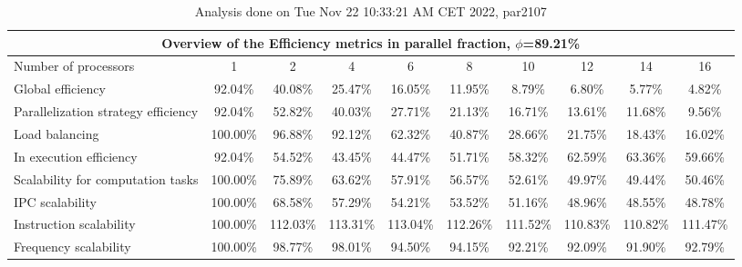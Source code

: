 \begin{table}[h]
\begin{center}
\begin{tabular}{|l|c|c|c|c|c|c|c|c|c|}
\hline
\multicolumn{10}{|c|}{Overview of the Efficiency metrics in parallel fraction, $\phi$=89.21\%} \\
\hline
\hline
Number of processors & 1 & 2 & 4 & 6 & 8 & 10 & 12 & 14 & 16 \\
\hline
\hline
Global efficiency                      &     92.04\% &     40.08\% &     25.47\% &     16.05\% &     11.95\% &      8.79\% &      6.80\% &      5.77\% &      4.82\% \\
\hline
\hline
Parallelization strategy efficiency &     92.04\% &     52.82\% &     40.03\% &     27.71\% &     21.13\% &     16.71\% &     13.61\% &     11.68\% &      9.56\% \\
\hline
Load balancing                   &    100.00\% &     96.88\% &     92.12\% &     62.32\% &     40.87\% &     28.66\% &     21.75\% &     18.43\% &     16.02\% \\
In execution efficiency          &     92.04\% &     54.52\% &     43.45\% &     44.47\% &     51.71\% &     58.32\% &     62.59\% &     63.36\% &     59.66\% \\
\hline
\hline
Scalability for computation tasks   &    100.00\% &     75.89\% &     63.62\% &     57.91\% &     56.57\% &     52.61\% &     49.97\% &     49.44\% &     50.46\% \\
\hline
IPC scalability                  &    100.00\% &     68.58\% &     57.29\% &     54.21\% &     53.52\% &     51.16\% &     48.96\% &     48.55\% &     48.78\% \\
Instruction scalability          &    100.00\% &    112.03\% &    113.31\% &    113.04\% &    112.26\% &    111.52\% &    110.83\% &    110.82\% &    111.47\% \\
Frequency scalability            &    100.00\% &     98.77\% &     98.01\% &     94.50\% &     94.15\% &     92.21\% &     92.09\% &     91.90\% &     92.79\% \\
\hline
\end{tabular}
\end{center}
\caption{ Analysis done on Tue Nov 22 10:33:21 AM CET 2022, par2107}
\end{table}
